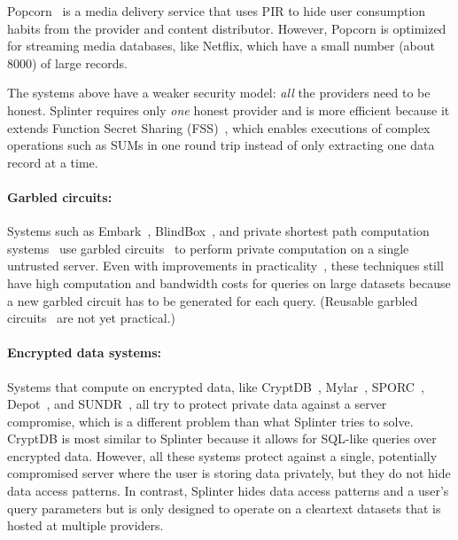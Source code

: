 Popcorn~\cite{popcorn} is a media delivery service that 
uses PIR to hide user consumption habits from the provider
and content distributor. However, Popcorn is optimized for
streaming media databases, like Netflix, which have a small number (about 8000)
of large records. 

The systems above have a weaker
security model: \textit{all} the providers need to be honest.
Splinter requires only \textit{one} honest provider and 
is more efficient because it 
extends Function Secret Sharing (FSS)~\cite{fss,gilboa2014distributed}, which 
enables executions of complex operations such as SUMs in one round trip
instead of only extracting one data record at a time.

\paragraph{Garbled circuits:}
Systems such as Embark~\cite{lan2016embark}, BlindBox~\cite{blindbox}, 
and private shortest path computation systems~\cite{wu2016}
use garbled circuits~\cite{Yao, goldwasser1997multi} to perform private computation
on a single untrusted server.
Even with improvements in practicality~\cite{bellare2013efficient}, these
techniques still have high computation and bandwidth costs for queries on
large datasets because a new garbled circuit has to be generated for each query.
(Reusable garbled circuits~\cite{goldwasser:sfe} are not yet practical.)

\paragraph{Encrypted data systems:}
Systems that compute on encrypted data, like 
CryptDB~\cite{popa:cryptdb}, Mylar~\cite{popa:mylar}, SPORC~\cite{feldman:sporc},
Depot~\cite{mahajan:depot}, and SUNDR~\cite{li:sundr}, all try to protect
private data against a server compromise, which is a different
problem than what Splinter tries to solve. CryptDB is most similar to Splinter 
because it allows for SQL-like queries over encrypted data. However, all
these systems protect against a single, potentially compromised server 
where the user is storing data privately, but they do not hide data access patterns. 
In contrast, Splinter hides data access patterns and a user's query parameters 
but is only designed to operate on a cleartext 
datasets that is hosted at multiple providers.


